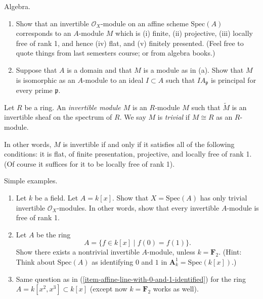 \begin{exercise}
\label{exercise-invertible-algebra}
Algebra.
\begin{enumerate}
\item Show that an invertible ${\mathcal O}_X$-module on
an affine scheme $\text{Spec}(A)$ corresponds to an $A$-module $M$ which is
(i) finite, (ii) projective, (iii) locally free of rank 1,
and hence (iv) flat, and (v) finitely presented. (Feel free to
quote things from last semesters course; or from algebra books.)
\item Suppose that $A$ is a domain and that $M$ is
a module as in (a). Show that $M$ is isomorphic as an $A$-module
to an ideal $I \subset A$ such that $IA_{\mathfrak p}$ is principal for
every prime ${\mathfrak p}$.
\end{enumerate}
\end{exercise}

\begin{definition}
\label{definition-invertible-module}
Let $R$ be a ring. An {\it invertible module $M$} is an $R$-module
$M$ such that $\widetilde M$ is an invertible sheaf on the
spectrum of $R$. We say $M$ is {\it trivial} if $M \cong R$ as
an $R$-module.
\end{definition}

\noindent
In other words, $M$ is invertible if and only if
it satisfies all of the following conditions:
it is flat, of finite presentation, projective, and
locally free of rank 1. (Of course it suffices for it
to be locally free of rank 1).

\begin{exercise}
\label{exercise-simple-examples-invertible}
Simple examples.
\begin{enumerate}
\item
\label{item-affine-line}
Let $k$ be a field. Let $A = k[x]$.
Show that $X = \text{Spec}(A)$ has only trivial invertible
${\mathcal O}_X$-modules. In other words, show that every
invertible $A$-module is free of rank 1.
\item
\label{item-affine-line-with-0-and-1-identified}
Let $A$ be the ring
$$
A = \{ f\in k[x] \mid f(0) = f(1) \}.
$$
Show there exists a nontrivial invertible $A$-module, unless
$k = {\mathbf F}_2$. (Hint: Think about $\text{Spec}(A)$ as identifying
$0$ and $1$ in ${\mathbf A}^1_k = \text{Spec}(k[x])$.)
\item
\label{item-affine-line-with-cusp}
Same question as in (\ref{item-affine-line-with-0-and-1-identified})
for the ring $A = k[x^2, x^3] \subset k[x]$
(except now $k = {\mathbf F}_2$ works as well).
\end{enumerate}
\end{exercise}


